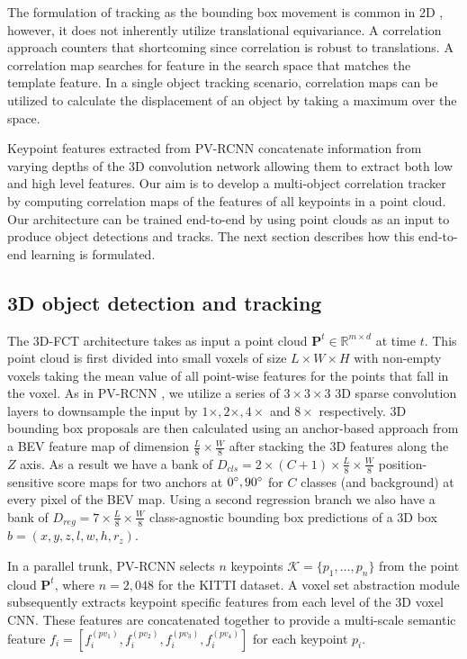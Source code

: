 \documentclass[10pt,twocolumn,letterpaper]{article}
\begin{document}
The formulation of tracking as the bounding box movement is common in 2D \cite{Held2016}, however, it does not inherently utilize translational equivariance. A correlation approach counters that shortcoming since correlation is robust to translations. A correlation map searches for feature in the search space that matches the template feature. In a single object tracking scenario, correlation maps can be utilized to calculate the displacement of an object by taking a maximum over the space.

Keypoint features extracted from PV-RCNN concatenate information from varying depths of the 3D convolution network allowing them to extract both low and high level features. Our aim is to develop a multi-object correlation tracker by computing correlation maps of the features of all keypoints in a point cloud. Our architecture can be trained end-to-end by using point clouds as an input to produce object detections and tracks. The next section describes how this end-to-end learning is formulated.

\subsection{3D object detection and tracking}\label{sec:method:DnT}
The 3D-FCT architecture takes as input a point cloud $\mathbf{P}^t\in \mathbb{R}^{m\times d}$ at time $t$. This point cloud is first divided into small voxels of size $L\times W\times H$ with non-empty voxels taking the mean value of all point-wise features for the points that fall in the voxel. As in PV-RCNN \cite{Shi_2020_CVPR}, we utilize a series of $3\times 3\times 3$ 3D sparse convolution layers to downsample the input by $1\times, 2\times, 4\times$ and $8\times$ respectively. 3D bounding box proposals are then calculated using an anchor-based approach from a BEV feature map of dimension $\frac{L}{8}\times\frac{W}{8}$ after stacking the 3D features along the $Z$ axis. As a result we have a bank of $D_{cls} = 2\times (C+1)\times\frac{L}{8}\times\frac{W}{8}$ position-sensitive score maps for two anchors at $0\degree, 90\degree$ for $C$ classes (and background) at every pixel of the BEV map. Using a second regression branch we also have a bank of $D_{reg} = 7\times\frac{L}{8}\times\frac{W}{8}$ class-agnostic bounding box predictions of a 3D box $b = (x, y, z, l, w, h, r_z)$.

In a parallel trunk, PV-RCNN \cite{Shi_2020_CVPR} selects $n$ keypoints $\mathcal{K} = \{p_1, \ldots, p_n\}$ from the point cloud  $\mathbf{P}^t$, where $n=2,048$ for the KITTI dataset. A voxel set abstraction module subsequently extracts keypoint specific features from each level of the 3D voxel CNN. These features are concatenated together to provide a multi-scale semantic feature $f_i = \left[f_i^{(pv_1)}, f_i^{(pv_2)}, f_i^{(pv_3)}, f_i^{(pv_4)}\right]$ for each keypoint $p_i$.
\end{document}
